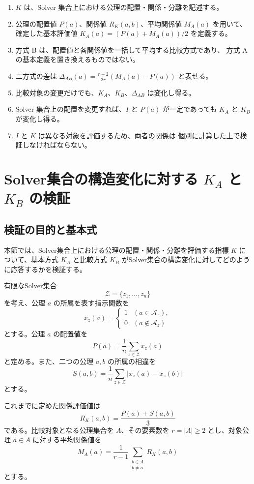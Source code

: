 \documentclass[a4paper,11pt]{ltjsarticle}
\begin{document}
\begin{enumerate}
  \item $K$ は、Solver 集合上における公理の配置・関係・分離を記述する。
  \item 公理の配置値 $P(a)$、関係値 $R_K(a,b)$、平均関係値 $M_A(a)$
        を用いて、確定した基本評価値
        $K_A(a)=(P(a)+M_A(a))/2$ を定義する。
  \item 方式 B は、配置値と各関係値を一括して平均する比較方式であり、
        方式 A の基本定義を置き換えるものではない。
  \item 二方式の差は
        $\Delta_{AB}(a)=\frac{r-2}{2r}(M_A(a)-P(a))$
        と表せる。
  \item 比較対象の変更だけでも、$K_A$、$K_B$、$\Delta_{AB}$ は変化し得る。
  \item Solver 集合上の配置を変更すれば、$I$ と $P(a)$ が一定であっても
        $K_A$ と $K_B$ が変化し得る。
  \item $I$ と $K$ は異なる対象を評価するため、両者の関係は
        個別に計算した上で検証しなければならない。
\end{enumerate}

\section{Solver集合の構造変化に対する $K_A$ と $K_B$ の検証}
\label{sec:K-structural-verification}

\subsection{検証の目的と基本式}

本節では、Solver集合上における公理の配置・関係・分離を評価する指標 $K$ について、基本方式 $K_A$ と比較方式 $K_B$ がSolver集合の構造変化に対してどのように応答するかを検証する。

有限なSolver集合
\[
\mathcal{Z}=\{z_1,\ldots,z_n\}
\]
を考え、公理 $a$ の所属を表す指示関数を
\[
x_z(a)=
\begin{cases}
1 & (a\in\mathcal{A}_z),\\
0 & (a\notin\mathcal{A}_z)
\end{cases}
\]
とする。公理 $a$ の配置値を
\[
P(a)=\frac{1}{n}\sum_{z\in\mathcal{Z}}x_z(a)
\]
と定める。また、二つの公理 $a,b$ の所属の相違を
\[
S(a,b)=\frac{1}{n}\sum_{z\in\mathcal{Z}}
\lvert x_z(a)-x_z(b)\rvert
\]
とする。

これまでに定めた関係評価値は
\[
R_K(a,b)=\frac{P(a)+S(a,b)}{3}
\]
である。比較対象となる公理集合を $A$、その要素数を
$r=|A|\geq 2$ とし、対象公理 $a\in A$ に対する平均関係値を
\[
M_A(a)=
\frac{1}{r-1}
\sum_{\substack{b\in A\\b\ne a}}R_K(a,b)
\]
とする。
\end{document}
